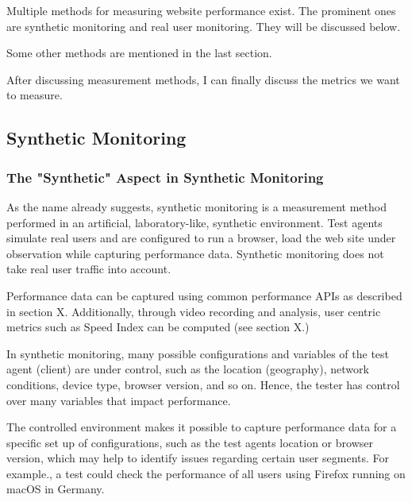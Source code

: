 
Multiple methods for measuring website performance exist.
The prominent ones are synthetic monitoring and real user monitoring.
They will be discussed below.

Some other methods are mentioned in the last section.

After discussing measurement methods, I can finally discuss the metrics we want to measure.







\subsection{Synthetic Monitoring}


\subsubsection{The "Synthetic" Aspect in Synthetic Monitoring}


As the name already suggests, synthetic monitoring is a measurement method performed in an artificial, laboratory-like, synthetic environment.
Test agents simulate real users and are configured to run a browser, load the web site under observation while capturing performance data.
Synthetic monitoring does not take real user traffic into account. %

Performance data can be captured using common performance APIs as described in section X.
Additionally, through video recording and analysis,  user centric metrics such as Speed Index can be computed (see section X.) %

In synthetic monitoring, many possible configurations and variables of the test agent (client) are under control, such as the location (geography), network conditions, device type, browser version, and so on. %
Hence, the tester has control over many variables that impact performance. %

The controlled environment makes it possible to capture performance data for a specific set up of configurations, such as the test agents location or browser version, which may help to identify issues regarding certain user segments.  For example., a test could check the performance of all users using Firefox running on macOS in Germany. %

